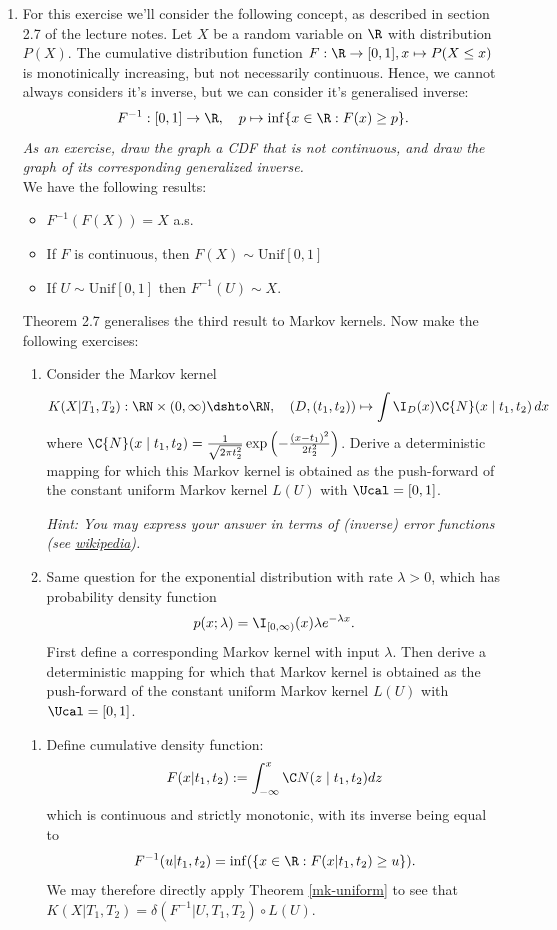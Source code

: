 \begin{enumerate}
  \item %
  For this exercise we'll consider the following concept, as described in section 2.7 of the lecture notes. Let $X$ be a random variable on $\R$ with distribution $P(X)$. The cumulative distribution function $F:\R \to [0,1], x \mapsto P(X\leq x)$ is monotinically increasing, but not necessarily continuous. Hence, we cannot always considers it's inverse, but we can consider it's generalised inverse:
  $$F^{-1}: [0,1] \to \R,\quad p \mapsto \inf\{x \in \R : F(x)\geq p\}.$$
  \emph{As an exercise, draw the graph a CDF that is not continuous, and draw the graph of its corresponding generalized inverse.}\\
  We have the following results:
  \begin{itemize}
    \item $F^{-1}(F(X)) = X$ a.s.
    \item If $F$ is continuous, then $F(X) \sim \textrm{Unif}[0,1]$
    \item If $U\sim \textrm{Unif}[0,1]$ then $F^{-1}(U) \sim X$.
  \end{itemize}
  Theorem 2.7 generalises the third result to Markov kernels. Now make the following exercises:
  \begin{enumerate}
    \item
    Consider the Markov kernel
    $$K(X|T_1,T_2) : \RN\times(0,\infty) \dshto \RN,\quad (D,(t_1,t_2)) \mapsto \int \I_D(x) \C{N}(x \mid t_1,t_2) \,dx$$
    where $\C{N}(x \mid t_1,t_2) = \frac{1}{\sqrt{2\pi t_2^2}} \exp\left(-\frac{(x-t_1)^2}{2 t_2^2}\right)$.
    Derive a deterministic mapping for which this Markov kernel is obtained as the push-forward of the constant uniform Markov kernel $L(U)$ with $\Ucal = [0,1]$.

    \emph{Hint: You may express your answer in terms of (inverse) error functions (see \href{https://en.wikipedia.org/wiki/Error_function}{wikipedia}).}

    \item %
    Same question for the exponential distribution with rate $\lambda > 0$, which has probability density function
    $$p(x;\lambda) = \I_{[0,\infty)}(x) \lambda e^{-\lambda x}.$$
    First define a corresponding Markov kernel with input $\lambda$. Then derive a deterministic mapping for which that Markov kernel is obtained as the push-forward of the constant uniform Markov kernel $L(U)$ with $\Ucal = [0,1]$.
  \end{enumerate}
  \begin{gradedsolution}
    \begin{enumerate}
      \item {}
      Define cumulative density function:
      \[
        F(x|t_1, t_2):= \int_{-\infty}^x \C N(z \mid t_1, t_2)dz
      \]
      which is continuous and strictly monotonic, with its inverse being equal to
      $$F^{-1}(u|t_1, t_2) = \inf(\{x\in \R : F(x | t_1,t_2) \geq u\}).$$
      We may therefore directly apply Theorem \ref*{mk-uniform} to see that $K(X|T_1, T_2) = \delta(F^{-1}|U, T_1, T_2) \circ L(U)$.


\end{enumerate}
\end{gradedsolution}
\end{enumerate}
